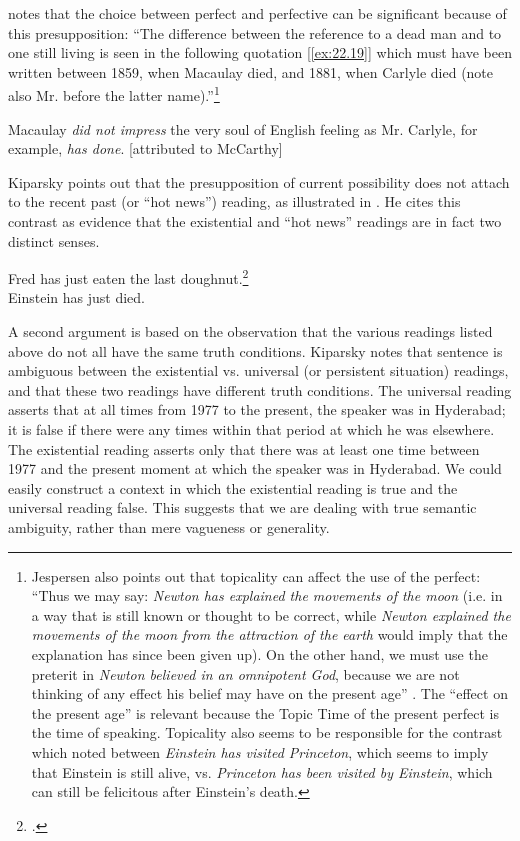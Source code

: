 \citet[66--67]{Jespersen1931} notes that the choice between perfect and perfective can be significant because of this presupposition: “The difference between the reference to a dead man and to one still living is seen in the following quotation [\ref{ex:22.19}] which must have been written between 1859, when Macaulay died, and 1881, when Carlyle died (note also Mr. before the latter name).”\footnote{Jespersen also points out that topicality can affect the use of the perfect: “Thus we may say: \textit{Newton has explained the movements of the moon} (i.e. in a way that is still known or thought to be correct, while \textit{Newton explained the movements of the moon from the attraction of the earth} would imply that the explanation has since been given up). On the other hand, we must use the preterit in \textit{Newton believed in an omnipotent God}, because we are not thinking of any effect his belief may have on the present age” \citep[66]{Jespersen1931}. The “effect on the present age” is relevant because the Topic Time of the present perfect is the time of speaking. Topicality also seems to be responsible for the contrast which \citet{Chomsky1970} noted between \textit{Einstein has visited Princeton}, which seems to imply that Einstein is still alive, vs. \textit{Princeton has been visited by Einstein}, which can still be felicitous after Einstein’s death.}


\ea \label{ex:22.19}
Macaulay \textit{did not impress} the very soul of English feeling as Mr. Carlyle, for example, \textit{has done}. [attributed to McCarthy]
\z


Kiparsky points out that the presupposition of current possibility does not attach to the recent past (or “hot news”) reading, as illustrated in . He cites this contrast as evidence that the existential and “hot news” readings are in fact two distinct senses.


\ea \label{ex:22.20}
\ea Fred has just eaten the last doughnut.\footnote{\citet{Kiparsky2002}.} \\
\ex Einstein has just died.
                       \z
\z


A second argument is based on the observation that the various readings listed above do not all have the same truth conditions. Kiparsky notes that sentence  is ambiguous between the existential vs. universal (or persistent situation) readings, and that these two readings have different truth conditions. The universal reading asserts that at all times from 1977 to the present, the speaker was in Hyderabad; it is false if there were any times within that period at which he was elsewhere. The existential reading asserts only that there was at least one time between 1977 and the present moment at which the speaker was in Hyderabad. We could easily construct a context in which the existential reading is true and the universal reading false. This suggests that we are dealing with true semantic ambiguity, rather than mere vagueness or generality.


